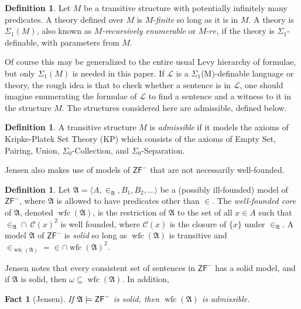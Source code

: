 \documentclass{amsart}
\newtheorem{fact}[theorem]{Fact}
\theoremstyle{definition}
\newtheorem{definition}[theorem]{Definition}
\theoremstyle{remark}
\DeclareMathOperator{\wfc}{wfc}
\begin{document}
\begin{definition} Let $M$ be a transitive structure with potentially infinitely many predicates. A theory defined over $M$ is $M$-\emph{finite} so long as it is in $M$. A theory is $\Sigma_1(M)$, also known as \emph{$M$-recursively enumerable} or $M$-$re$, if the theory is $\Sigma_1$-definable, with parameters from $M$. \end{definition}
Of course this may be generalized to the entire usual Levy hierarchy of formulae, but only $\Sigma_1(M)$ is needed in this paper. If $\mathcal L$ is a $\Sigma_1$(M)-definable language or theory, the rough idea is that to check whether a sentence is in $\mathcal L$, one should imagine enumerating the formulae of $\mathcal L$ to find a sentence and a witness to it in the structure $M$. The structures considered here are admissible, defined below.

\begin{definition} A transitive structure $M$ is \emph{admissible} if it models the axioms of \textsf{Kripke-Platek Set Theory} (\textsf{KP}) which consists of the axioms of \textsf{Empty Set}, \textsf{Pairing}, \textsf{Union}, $\Sigma_0$-\textsf{Collection}, and $\Sigma_0$-\textsf{Separation}. \end{definition}

Jensen also makes use of models of $\textsf{ZF}^-$ that are not necessarily well-founded.
\begin{definition} Let $\mathfrak A = \langle A, \in_{\mathfrak A}, B_1, B_2, \dots \rangle$ be a (possibly ill-founded) model  of $\textsf{ZF}^-$, where $\mathfrak A$ is allowed to have predicates other than $\in$. The \emph{well-founded core} of $\mathfrak A$, denoted $\wfc(\mathfrak A)$, is the restriction of $\mathfrak A$ to the set of all $x \in A$ such that $\in_{\mathfrak A} \cap \ \mathcal C(x)^2$ is well founded, where $\mathcal C(x)$ is the closure of $\{x\}$ under $\in_{\mathfrak A}$. A model $\mathfrak A$ of $\textsf{ZF}^-$ is \emph{solid} so long as $\wfc(\mathfrak A)$ is transitive and $\in_{\wfc(\mathfrak A)}=\in \cap \wfc(\mathfrak A)^2$. \end{definition}

Jensen \cite[Section 1.2]{Jensen:2012fr} notes that every consistent set of sentences in $\textsf{ZF}^-$ has a solid model, and if $\mathfrak A$ is solid, then $\omega \subseteq \wfc(\mathfrak A)$. In addition,

\begin{fact}[Jensen] If $\mathfrak A \models \textsf{\textup{ZF}}^-$ is solid, then $\wfc(\mathfrak A)$ is admissible. \end{fact}
\end{document}
